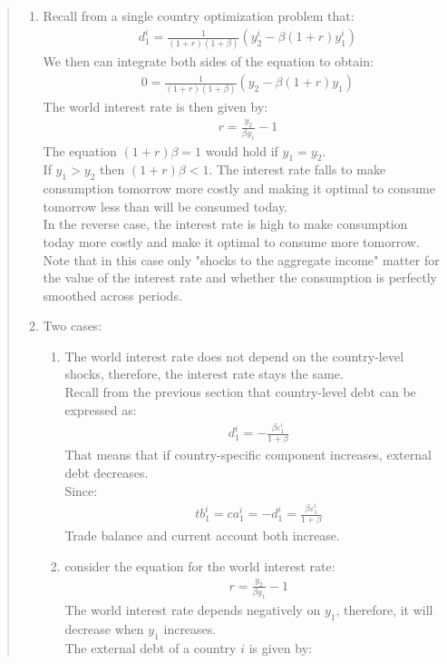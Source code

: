 \begin{exercise}
\begin{quote}
\begin{enumerate}
\item 
 Recall from a single country optimization problem that:
\begin{align*}
&d^i_1 = \frac{1}{(1+r)(1+\beta)}(y^i_2 - \beta(1+r)y^i_1)
\end{align*}
We then can integrate both sides of the equation to obtain:
\begin{align*}
&0 = \frac{1}{(1+r)(1+\beta)}(y_2 - \beta(1+r)y_1)
\end{align*}
The world interest rate is then given by:
\begin{align*}
& r = \frac{y_2}{\beta y_1} - 1
\end{align*}
The equation $(1+r)\beta = 1$ would  hold if $y_1 = y_2$. 
\\ If $y_1 > y_2$ then $(1+r)\beta<1$. The interest rate falls to make consumption tomorrow more costly and making it optimal to consume tomorrow less than will be consumed today.
\\ In the reverse case, the interest rate is high to make consumption today more costly and make it optimal to consume more tomorrow. 
\\ Note that in this case only "shocks to the aggregate income" matter for the value of the interest rate and whether the consumption is perfectly smoothed across periods.
\item Two cases: 
\begin{enumerate}
\item 
 The world interest rate does not depend on the country-level shocks, therefore, the interest rate stays the same.
 \\ Recall from the previous section that country-level debt can be expressed as:
 \begin{align*}
& d^i_1 = -\frac{\beta \varepsilon_1^i}{1+\beta}
\end{align*} 
That means that if country-specific component increases, external debt decreases.
\\ Since:
\begin{align*}
&tb^i_1 = ca^i_1 =  -d_1^i = \frac{\beta \varepsilon_1^i}{1+\beta}
\end{align*}
Trade balance and current account both increase.
\item 
 consider the equation for the world interest rate:
\begin{align*}
& r = \frac{y_2}{\beta y_1} - 1
\end{align*}
The world interest rate depends negatively on $y_1$, therefore, it will decrease when $y_1$ increases.
\\ The external debt of a country $i$ is given by:

\end{enumerate}
\end{enumerate}
\end{quote}
\end{exercise}
